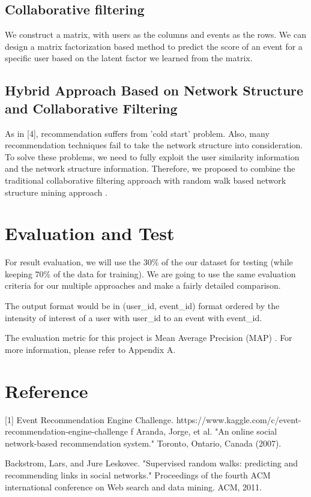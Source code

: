 \documentclass{article}
\begin{document}
\subsection{Collaborative filtering}
We construct a matrix, with users as the columns and events as the rows. We can design a matrix factorization based method to predict the score of an event for a specific user based on the latent factor we learned from the matrix.

\subsection{Hybrid Approach Based on Network Structure and Collaborative Filtering}
As in [4], recommendation suffers from 'cold start' problem. Also, many recommendation techniques fail to take the network structure into consideration. To solve these problems, we need to fully exploit the user similarity information and the network structure information. Therefore, we proposed to combine the traditional collaborative filtering approach with random walk based network structure mining approach . 

\section{Evaluation and Test}
For result evaluation, we will use the 30\% of the our dataset for testing (while keeping 70\% of the data for training). We are going to use the same evaluation criteria for our multiple approaches and make a fairly detailed comparison.

The output format would be in (user\_id, event\_id) format ordered by the intensity of interest of a user with user\_id to an event with event\_id.

The evaluation metric for this project is Mean Average Precision (MAP)	. For more information, please refer to Appendix A.


\section{Reference}
[1] Event Recommendation Engine Challenge.
https://www.kaggle.com/c/event-recommendation-engine-challenge
f
\noindent[2] Aranda, Jorge, et al. "An online social network-based recommendation system." Toronto, Ontario, Canada (2007).

\noindent[3] Backstrom, Lars, and Jure Leskovec. "Supervised random walks: predicting and recommending links in social networks." Proceedings of the fourth ACM international conference on Web search and data mining. ACM, 2011.
\end{document}
